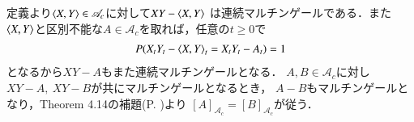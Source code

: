 	\begin{prf}
		定義より$\inprod<X,Y> \in \mathscr{A}_c$に対して$XY - \inprod<X,Y>$
		は連続マルチンゲールである．また$\inprod<X,Y>$と区別不能な$A \in \mathscr{A}_c$を取れば，任意の$t \geq 0$で
		\begin{align}
			P(X_t Y_t - \inprod<X,Y>_t = X_t Y_t - A_t) = 1
		\end{align}
		となるから$XY-A$もまた連続マルチンゲールとなる．
		$A,B \in \mathscr{A}_c$に対し$XY - A,\ XY-B$が共にマルチンゲールとなるとき，
		$A - B$もマルチンゲールとなり，Theorem 4.14の補題(P. \pageref{lem:uniqueness_of_Doob_Meyer_decomposition})より
		$[A]_{\mathscr{A}_c} = [B]_{\mathscr{A}_c}$が従う．
		\QED
	\end{prf}